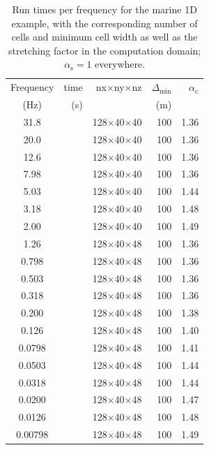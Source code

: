 \documentclass[onecolumn,extra,referee,camera]{gji}
\newlength{\twidth}
\newcommand{\mr}[1]{\mathrm{#1}}
\begin{document}
\begin{table}
\begin{minipage}{\twidth}
  \centering
  \caption{Run times per frequency for the marine 1D example, with the
    corresponding number of cells and minimum cell width as well as the
    stretching factor in the computation domain; $\alpha_\mr{s}=1$ everywhere.}
  \label{tbl:timemarine}
  \begin{tabular}{S[table-format=2.5]rrrr}
    \toprule
    {Frequency} & time & nx$\times$ny$\times$nz & $\Delta_\mr{min}$ & $\alpha_\mr{c}$ \\
    {(Hz)}  & (s) &  & (m) & \\
    \midrule
    31.8     &  & 128$\times$40$\times$40 & 100 & 1.36 \\
    20.0     &  & 128$\times$40$\times$40 & 100 & 1.36 \\
    12.6     &  & 128$\times$40$\times$40 & 100 & 1.36 \\
     7.98    &  & 128$\times$40$\times$40 & 100 & 1.36 \\
     5.03    &  & 128$\times$40$\times$40 & 100 & 1.44 \\
     3.18    &  & 128$\times$40$\times$40 & 100 & 1.48 \\
     2.00    &  & 128$\times$40$\times$40 & 100 & 1.49 \\
     1.26    &  & 128$\times$40$\times$48 & 100 & 1.36 \\
     0.798   &  & 128$\times$40$\times$48 & 100 & 1.36 \\
     0.503   &  & 128$\times$40$\times$48 & 100 & 1.36 \\
     0.318   &  & 128$\times$40$\times$48 & 100 & 1.36 \\
     0.200   &  & 128$\times$40$\times$48 & 100 & 1.38 \\
     0.126   &  & 128$\times$40$\times$48 & 100 & 1.40 \\
     0.0798  &  & 128$\times$40$\times$48 & 100 & 1.41 \\
     0.0503  &  & 128$\times$40$\times$48 & 100 & 1.44 \\
     0.0318  &  & 128$\times$40$\times$48 & 100 & 1.44 \\
     0.0200  &  & 128$\times$40$\times$48 & 100 & 1.47 \\
     0.0126  &  & 128$\times$40$\times$48 & 100 & 1.48 \\
     0.00798 &  & 128$\times$40$\times$48 & 100 & 1.49 \\
    \bottomrule
  \end{tabular}
\end{minipage}
\end{table}
%
\end{document}
